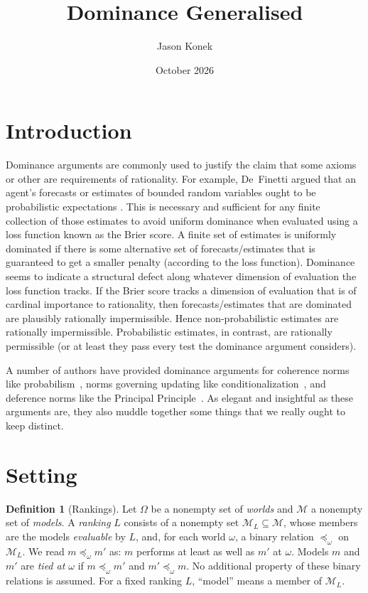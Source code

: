 \documentclass[11pt]{article}
\title{Dominance Generalised}
\author{Jason Konek}
\date{October 2026}
\theoremstyle{definition}
\newtheorem{definition}[theorem]{Definition}
\theoremstyle{remark}
\newcommand{\M}{\mathcal M}
\begin{document}
\maketitle

\section{Introduction}


Dominance arguments are commonly used to justify the claim that some axioms or other are requirements of rationality. For example, De~Finetti argued that an agent's forecasts or estimates of bounded random variables ought to be probabilistic expectations \cite[\S1.6, \S3.3]{deFinetti1974}. This is necessary and sufficient for any finite collection of those estimates to avoid uniform dominance when evaluated using a loss function known as the Brier score. A finite set of estimates is uniformly dominated if there is some alternative set of forecasts/estimates that is guaranteed to get a smaller penalty (according to the loss function). Dominance seems to indicate a structural defect along whatever dimension of evaluation the loss function tracks. If the Brier score tracks a dimension of evaluation that is of cardinal importance to rationality, then forecasts/estimates that are dominated are plausibly rationally impermissible. Hence non-probabilistic estimates are rationally impermissible. Probabilistic estimates, in contrast, are rationally permissible (or at least they pass every test the dominance argument considers).


A number of authors have provided dominance arguments for coherence norms like probabilism~\cite{Joyce2009,Predd2009,SSK2009,Pettigrew2022,Nielsen2023}, norms governing updating like conditionalization~\cite{Briggs2020,Nielsen2021}, and deference norms like the Principal Principle~\cite[Chapter~10]{Pettigrew2016}. As elegant and insightful as these arguments are, they also muddle together some things that we really ought to keep distinct.




\section{Setting}\label{sec:setting}

\begin{definition}[Rankings]\label{def:rankings}
Let $\Omega$ be a nonempty set of \emph{worlds} and $\M$ a nonempty set of \emph{models}. A \emph{ranking} $L$ consists of a nonempty set $\M_L\subseteq\M$, whose members are the models \emph{evaluable} by $L$, and, for each world $\omega$, a binary relation $\preceq_\omega$ on $\M_L$. We read $m\preceq_\omega m'$ as: $m$ performs at least as well as $m'$ at $\omega$. Models $m$ and $m'$ are \emph{tied at $\omega$} if $m\preceq_\omega m'$ and $m'\preceq_\omega m$. No additional property of these binary relations is assumed. For a fixed ranking $L$, ``model'' means a member of $\M_L$.
\end{definition}
\end{document}

